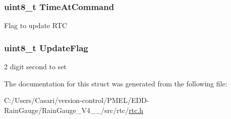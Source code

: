 \subsubsection[{Time\+At\+Command}]{\setlength{\rightskip}{0pt plus 5cm}uint8\+\_\+t Time\+At\+Command}\label{struct___r_t_c_struct__s_aea562614f5f4bba45a661bf5b04fe2bf}
Flag to update R\+T\+C \hypertarget{struct___r_t_c_struct__s_ae3cd5de8a74a11304d1d296efe219545}{}
\subsubsection[{Update\+Flag}]{\setlength{\rightskip}{0pt plus 5cm}uint8\+\_\+t Update\+Flag}\label{struct___r_t_c_struct__s_ae3cd5de8a74a11304d1d296efe219545}
2 digit second to set 

The documentation for this struct was generated from the following file\+:\begin{DoxyCompactItemize}
\item 
C\+:/\+Users/\+Casari/version-\/control/\+P\+M\+E\+L/\+E\+D\+D-\/\+Rain\+Gauge/\+Rain\+Gauge\+\_\+\+V4\+\_\+\_/src/rtc/\hyperlink{rtc_8h}{rtc.\+h}\end{DoxyCompactItemize}

